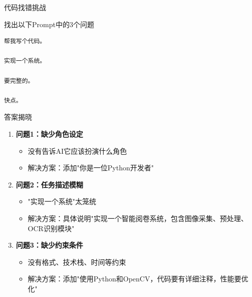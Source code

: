 \begin{frame}[fragile]{代码找错挑战}
	\begin{exampleblock}{找出以下Prompt中的3个问题}
		\begin{lstlisting}[language=Python, basicstyle=\ttfamily\small]
帮我写个代码。

实现一个系统。

要完整的。

快点。
		\end{lstlisting}
	\end{exampleblock}

	\vspace{0.3cm}

	\begin{block}{答案揭晓}
		\begin{enumerate}
			\item \textbf{问题1：缺少角色设定}
			\begin{itemize}
				\item 没有告诉AI它应该扮演什么角色
				\item 解决方案：添加"你是一位Python开发者"
			\end{itemize}

			\item \textbf{问题2：任务描述模糊}
			\begin{itemize}
				\item "实现一个系统"太笼统
				\item 解决方案：具体说明"实现一个智能阅卷系统，包含图像采集、预处理、OCR识别模块"
			\end{itemize}

			\item \textbf{问题3：缺少约束条件}
			\begin{itemize}
				\item 没有格式、技术栈、时间等约束
				\item 解决方案：添加"使用Python和OpenCV，代码要有详细注释，性能要优化"
			\end{itemize}
		\end{enumerate}
	\end{block}
\end{frame}
